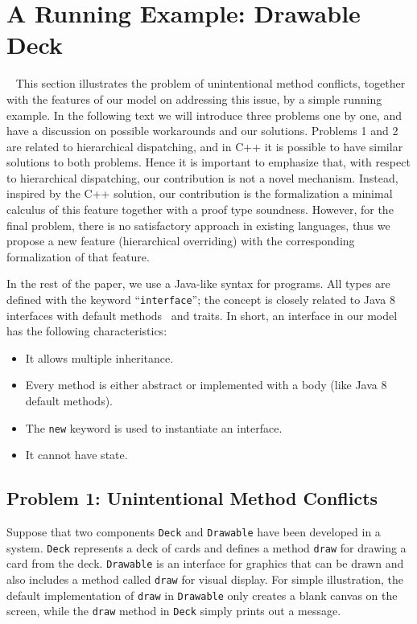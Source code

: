 \section{A Running Example: Drawable Deck}~\label{sec:overview}
This section illustrates the problem of unintentional method conflicts,
together with the features of our model on addressing this issue, by
a simple running example. In the following text we will introduce three
problems one by one, and have a discussion on possible workarounds and
our solutions.
Problems 1 and 2 are related to hierarchical dispatching, and in 
C++ it is possible to have similar solutions to both
problems. Hence it is important to emphasize that, with respect to
hierarchical dispatching, our contribution is not a novel
mechanism. Instead, 
inspired by the C++ solution, our contribution is the formalization a minimal calculus
of this feature together with a proof type soundness. However, for the final problem, there is no satisfactory approach
in existing languages, thus we propose a new feature (hierarchical
overriding) with the corresponding formalization of that feature.

In the rest of the paper, we use a Java-like syntax for programs. All types are defined with the keyword
``\lstinline|interface|''; the concept is closely related to Java 8
interfaces with default methods~\cite{bono14} and traits. In short, 
an interface in our model has the following characteristics:
\begin{itemize}
	\item It allows multiple inheritance.
	\item Every method is either abstract or implemented with a body (like Java 8 default methods). 
	\item The \lstinline|new| keyword is used to instantiate an interface.
	\item It cannot have state.
\end{itemize}


\subsection{Problem 1: Unintentional Method Conflicts}
Suppose that two components \lstinline|Deck| and \lstinline|Drawable| 
have been developed in a system. \lstinline|Deck| represents a deck
of cards and defines a method \lstinline|draw| for drawing a card from the
deck.  \lstinline|Drawable| is an interface for graphics that
can be drawn and also includes a method called \lstinline|draw| for
visual display. For simple illustration, the default implementation of
\lstinline|draw| in \lstinline|Drawable| only creates a blank canvas
on the screen, while the \lstinline|draw| method in \lstinline|Deck| simply
prints out a message.

